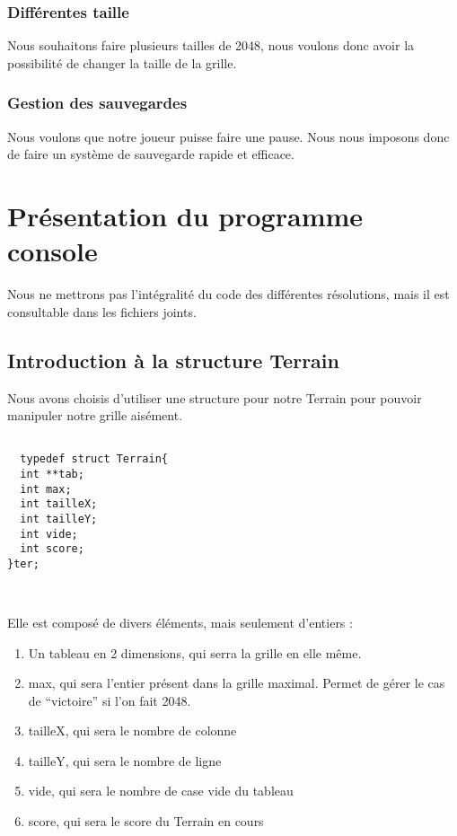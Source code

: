 \documentclass[letter]{article}
\begin{document}
\subsubsection{Différentes taille}
\label{sec:org650b468}

Nous souhaitons faire plusieurs tailles de 2048, nous voulons donc avoir la possibilité de changer la taille de la grille.

\subsubsection{Gestion des sauvegardes}
\label{sec:org3397192}

Nous voulons que notre joueur puisse faire une pause. Nous nous imposons donc de faire un système de sauvegarde rapide et efficace.

\section{Présentation du programme console}
\label{sec:org47b6c16}

Nous ne mettrons pas l'intégralité du code des différentes résolutions, mais il est consultable dans les fichiers joints.

\subsection{Introduction à la structure Terrain}
\label{sec:orgde715e9}

Nous avons choisis d'utiliser une structure pour notre Terrain pour pouvoir manipuler notre grille aisément.

\begin{verbatim}

  typedef struct Terrain{
  int **tab;
  int max;
  int tailleX;
  int tailleY;
  int vide;
  int score;
}ter;



\end{verbatim}

Elle est composé de divers éléments, mais seulement d'entiers :

\begin{enumerate}
\item Un tableau en 2 dimensions, qui serra la grille en elle même.
\item max, qui sera l'entier présent dans la grille maximal. Permet de gérer le cas de “victoire” si l'on fait 2048.
\item tailleX, qui sera le nombre de colonne
\item tailleY, qui sera le nombre de ligne
\item vide, qui sera le nombre de case vide du tableau
\item score, qui sera le score du Terrain en cours
\end{enumerate}
\end{document}
